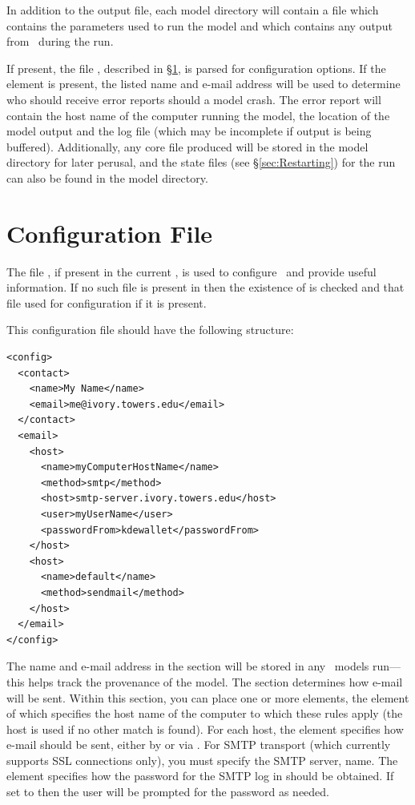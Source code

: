 In addition to the  output file, each model directory will contain a file  which contains the parameters used to run the model and  which contains any output from \glc\ during the run.

If present, the file , described in \S\ref{sec:ConfigFile}, is parsed for configuration options. If the  element is present, the listed name and e-mail address will be used to determine who should receive error reports should a model crash. The error report will contain the host name of the computer running the model, the location of the model output and the log file (which may be incomplete if output is being buffered). Additionally, any core file produced will be stored in the model directory for later perusal, and the state files (see \S\ref{sec:Restarting}) for the run can also be found in the model directory.

\section{Configuration File}\label{sec:ConfigFile}

The file , if present in the current , is used to configure \glc\ and provide useful information. If no such file is present in  then the existence of  is checked and that file used for configuration if it is present.

This configuration file should have the following structure:
\begin{verbatim}
<config>
  <contact>
    <name>My Name</name>
    <email>me@ivory.towers.edu</email>
  </contact>
  <email>
    <host>
      <name>myComputerHostName</name>
      <method>smtp</method>
      <host>smtp-server.ivory.towers.edu</host>
      <user>myUserName</user>
      <passwordFrom>kdewallet</passwordFrom>
    </host>
    <host>
      <name>default</name>
      <method>sendmail</method>
    </host>
  </email>
</config>
\end{verbatim}
The name and e-mail address in the  section will be stored in any \glc\ models run---this helps track the provenance of the model. The  section determines how e-mail will be sent. Within this section, you can place one or more  elements, the  element of which specifies the host name of the computer to which these rules apply (the  host is used if no other match is found). For each host, the  element specifies how e-mail should be sent, either by  or via . For SMTP transport (which currently supports SSL connections only), you must specify the  SMTP server,  name. The  element specifies how the password for the SMTP log in should be obtained. If set to  then the user will be prompted for the password as needed.

